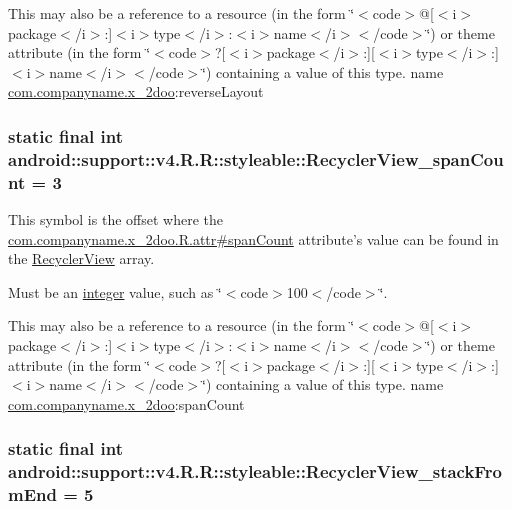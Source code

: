 This may also be a reference to a resource (in the form \char`\"{}$<$code$>$@\mbox{[}$<$i$>$package$<$/i$>$:\mbox{]}$<$i$>$type$<$/i$>$:$<$i$>$name$<$/i$>$$<$/code$>$\char`\"{}) or theme attribute (in the form \char`\"{}$<$code$>$?\mbox{[}$<$i$>$package$<$/i$>$:\mbox{]}\mbox{[}$<$i$>$type$<$/i$>$:\mbox{]}$<$i$>$name$<$/i$>$$<$/code$>$\char`\"{}) containing a value of this type.  name \hyperlink{namespacecom_1_1companyname_1_1x__2doo}{com.companyname.x\_\-2doo}:reverseLayout \hypertarget{classandroid_1_1support_1_1v4_1_1_r_1_1styleable_5a5fe0e2fd166ebd52eb768888d065db}{
\subsubsection[{RecyclerView\_\-spanCount}]{\setlength{\rightskip}{0pt plus 5cm}static final int android::support::v4.R.R::styleable::RecyclerView\_\-spanCount = 3}}
\label{classandroid_1_1support_1_1v4_1_1_r_1_1styleable_5a5fe0e2fd166ebd52eb768888d065db}


This symbol is the offset where the \hyperlink{classcom_1_1companyname_1_1x__2doo_1_1_r_1_1attr_46670bdd33dae861b08f43b868c9147a}{com.companyname.x\_\-2doo.R.attr\#spanCount} attribute's value can be found in the \hyperlink{classandroid_1_1support_1_1v4_1_1_r_1_1styleable_2cdeae02a2aae8e03f8765ed3a43caf5}{RecyclerView} array.

Must be an \hyperlink{classandroid_1_1support_1_1v4_1_1_r_1_1integer}{integer} value, such as \char`\"{}$<$code$>$100$<$/code$>$\char`\"{}. 

This may also be a reference to a resource (in the form \char`\"{}$<$code$>$@\mbox{[}$<$i$>$package$<$/i$>$:\mbox{]}$<$i$>$type$<$/i$>$:$<$i$>$name$<$/i$>$$<$/code$>$\char`\"{}) or theme attribute (in the form \char`\"{}$<$code$>$?\mbox{[}$<$i$>$package$<$/i$>$:\mbox{]}\mbox{[}$<$i$>$type$<$/i$>$:\mbox{]}$<$i$>$name$<$/i$>$$<$/code$>$\char`\"{}) containing a value of this type.  name \hyperlink{namespacecom_1_1companyname_1_1x__2doo}{com.companyname.x\_\-2doo}:spanCount \hypertarget{classandroid_1_1support_1_1v4_1_1_r_1_1styleable_41dd2629b266247a80ee2bacd4525923}{
\subsubsection[{RecyclerView\_\-stackFromEnd}]{\setlength{\rightskip}{0pt plus 5cm}static final int android::support::v4.R.R::styleable::RecyclerView\_\-stackFromEnd = 5}}
\label{classandroid_1_1support_1_1v4_1_1_r_1_1styleable_41dd2629b266247a80ee2bacd4525923}


